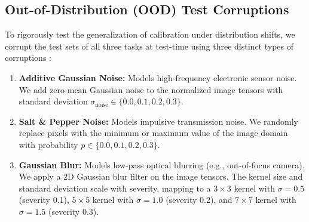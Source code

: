 \documentclass{article}
\begin{document}
\subsection{Out-of-Distribution (OOD) Test Corruptions}
To rigorously test the generalization of calibration under distribution shifts, we corrupt the test sets of all three tasks at test-time using three distinct types of corruptions \cite{hendrycks2019robustness}:
\begin{enumerate}
    \item \textbf{Additive Gaussian Noise:} Models high-frequency electronic sensor noise. We add zero-mean Gaussian noise to the normalized image tensors with standard deviation $\sigma_{\mathrm{noise}} \in \{0.0, 0.1, 0.2, 0.3\}$.
    \item \textbf{Salt \& Pepper Noise:} Models impulsive transmission noise. We randomly replace pixels with the minimum or maximum value of the image domain with probability $p \in \{0.0, 0.1, 0.2, 0.3\}$.
    \item \textbf{Gaussian Blur:} Models low-pass optical blurring (e.g., out-of-focus camera). We apply a 2D Gaussian blur filter on the image tensors. The kernel size and standard deviation scale with severity, mapping to a $3 \times 3$ kernel with $\sigma=0.5$ (severity 0.1), $5 \times 5$ kernel with $\sigma=1.0$ (severity 0.2), and $7 \times 7$ kernel with $\sigma=1.5$ (severity 0.3).
\end{enumerate}
\end{document}
